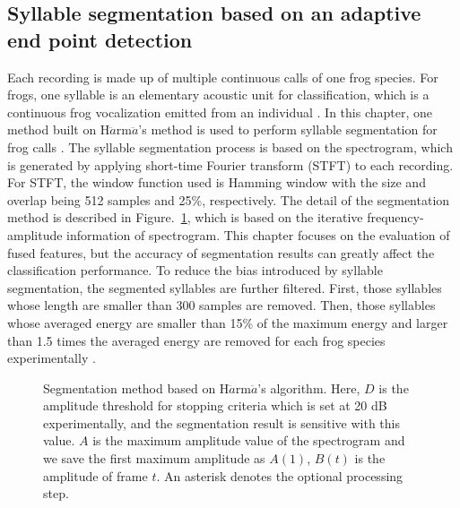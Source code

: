 \subsection{Syllable segmentation based on an adaptive end point detection}
Each recording is made up of multiple continuous calls of one frog species. For frogs, one syllable is an elementary acoustic unit for classification, which is a continuous frog vocalization emitted from an individual \citep{huang2009frog}. In this chapter, one method built on H$\ddot{a}$rm$\ddot{a}$'s method is used to perform syllable segmentation for frog calls \citep{harma2003automatic}. The syllable segmentation process is based on the spectrogram, which is generated by applying short-time Fourier transform (STFT) to each recording. For STFT, the window function used is Hamming window with the size and overlap being 512 samples and 25\%, respectively. The detail of the segmentation method is described in Figure.~\ref{fig:segmentation}, which is based on the iterative frequency-amplitude information of spectrogram. This chapter focuses on the evaluation of fused features, but the accuracy of segmentation results can greatly affect the classification performance. To reduce the bias introduced by syllable segmentation, the segmented syllables are further filtered. First, those syllables whose length are smaller than 300 samples are removed. Then, those syllables whose averaged energy are smaller than 15\% of the maximum energy and larger than 1.5 times the averaged energy are removed for each frog species experimentally \citep{Gingras2013}.   


\begin{figure}[htb!] %
\caption[H$\ddot{a}$rm$\ddot{a}$'s segmentation algorithm]{Segmentation method based on H$\ddot{a}$rm$\ddot{a}$'s algorithm. Here, $D$ is the amplitude threshold for stopping criteria which is set at 20 dB experimentally, and the segmentation result is sensitive with this value. $A$ is the maximum amplitude value of the spectrogram and we save the first maximum amplitude as $A(1)$, $B(t)$ is the amplitude of frame $t$. An asterisk denotes the optional processing step.}
\label{fig:segmentation} 
\end{figure}



